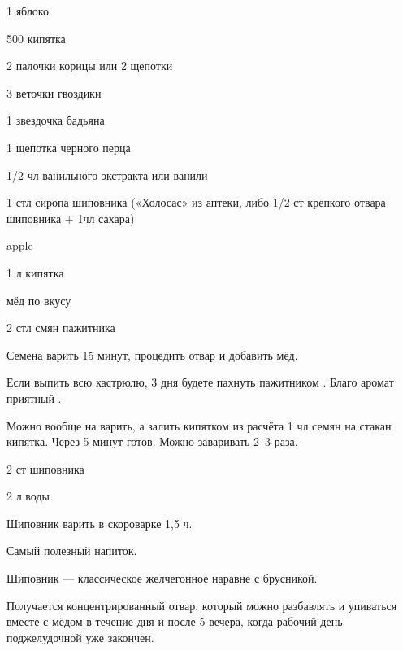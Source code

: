 {
\item 1 яблоко
\item 500 кипятка
\item 2 палочки корицы или 2 щепотки
\item 3 веточки гвоздики
\item 1 звездочка бадьяна
\item 1 щепотка черного перца
\item 1/2 чл ванильного экстракта или ванили
\item 1 стл сиропа шиповника («Холосас» из аптеки, либо 1/2 ст крепкого отвара шиповника + 1чл сахара)

}{
\item 
}{%
}{}{apple}




{
\item 1 л кипятка
\item мёд по вкусу
}{
\item 2 стл смян пажитника
}{
Семена варить 15 минут, процедить отвар и добавить мёд.
}{
\begin{advice}
\item Если выпить всю кастрюлю, 3 дня будете пахнуть пажитником \faSmileO. Благо аромат приятный \faSmileO.
\item Можно вообще на варить, а залить кипятком из расчёта 1 чл семян на стакан кипятка. Через 5 минут готов. Можно заваривать 2–3 раза. 
\end{advice}}{}



{
\item 2 ст шиповника
\item 2 л воды
}{
\item[] 
}{
Шиповник варить в скороварке 1,5 ч.
}{
\begin{advice}
    \item Самый полезный напиток.
    \item Шиповник — классическое желчегонное наравне с брусникой.
\item Получается концентрированный отвар, который можно разбавлять и упиваться вместе с мёдом в течение дня и после 5 вечера, когда рабочий день поджелудочной уже закончен. 

\end{advice}}{}





